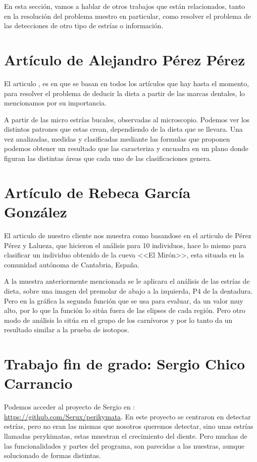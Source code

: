 
En esta sección, vamos a hablar de otros trabajos que están relacionados, tanto en la resolución del problema nuestro en particular, como resolver el problema de las detecciones de otro tipo de estrías o información.

\section{Artículo de Alejandro Pérez Pérez}
El articulo \cite{perez:perez}, es en que se basan en todos los artículos que hay hasta el momento, para resolver el problema de deducir la dieta a partir de las marcas dentales, lo mencionamos por su importancia.

A partir de las micro estrías bucales, observadas al microscopio. Podemos ver los distintos patrones que estas crean, dependiendo de la dieta que se llevara.
Una vez analizadas, medidas y clasificadas mediante las formulas que proponen podemos obtener un resultado que las caracteriza y encuadra en un plano donde figuran las distintas áreas que cada uno de las clasificaciones genera.

\section{Artículo de Rebeca García González}
El articulo \cite{Rebeca:garcia} de nuestro cliente nos muestra como basandose en el articulo \cite{perez:perez} de Pérez Pérez y Lalueza, que hicieron el análisis para 10 individuos, hace lo mismo para clasificar un individuo obtenido de la cueva <<El Mirón>>, esta situada en la comunidad autónoma de Cantabria, España.

A la muestra anteriormente mencionada se le aplicara el análisis de las estrías de dieta, sobre una imagen del premolar de abajo a la izquierda, P4 de la dentadura. 
Pero en la gráfica la segunda función que se usa para evaluar, da un valor muy alto, por lo que la función lo sitúa fuera de las elipses de cada región.
Pero otro modo de análisis lo sitúa en el grupo de los carnívoros y por lo tanto da un resultado similar a la prueba de isotopos.

\section{Trabajo fin de grado: Sergio Chico Carrancio}
Podemos acceder al proyecto de Sergio en : \url{https://github.com/Serux/perikymata}.
En este proyecto se centraron en detectar estrías, pero no eran las mismas que nosotros queremos detectar, sino unas estrías llamadas perykimatas, estas muestran el crecimiento del diente. Pero muchas de las funcionalidades y partes del programa, son parecidas a las nuestras, aunque solucionado de formas distintas.
